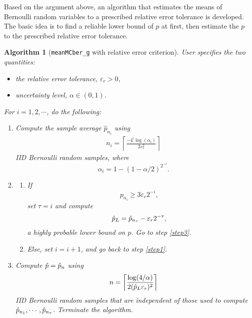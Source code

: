 \documentclass{iitthesis}
\newtheorem{algorithm}[theorem]{Algorithm}
\theoremstyle{definition}
\begin{document}
Based on the argument above, an algorithm that estimates the means of Bernoulli random variables to a prescribed relative error tolerance is developed. The basic idea is to find a reliable lower bound of $p$ at first, then estimate the $p$ to the prescribed relative error tolerance.
\begin{algorithm}[{\tt meanMCber\_g} with relative error criterion]\label{algrel}
User specifies the two quantities:
\begin{itemize}
\item the relative error tolerance, $\varepsilon_r > 0$, 
\item uncertainty level, $\alpha \in (0,1)$.
\end{itemize}
For $i = 1,2,\cdots$, do the following:
\begin{enumerate}
\item \label{step1} 
Compute the sample average $\hat{p}_{n_i}$ using 
\begin{align}\label{relalgni}
n_i = \left \lceil \frac{-4^i \log\left ( \alpha_i \right)}{2\varepsilon_r^2}\right \rceil
\end{align}
 IID Bernoulli random samples, where 
 \begin{equation}\label{alphaiBerRel}
 \alpha_i =1-(1-\alpha/2)^{2^{-i}}.
 \end{equation}
\item \label{step2}
\begin{enumerate}
\item If 
\begin{equation}\label{stoppingcriterionBerRel}
p_{n_i} \geq 3\varepsilon_r 2^{-i},
\end{equation} set $\tau=i$ and compute 
\begin{align}\label{def:hpl}
\hat{p}_L= \hat{p}_{n_\tau} - \varepsilon_r 2^{-\tau},
\end{align}
 a highly probable lower bound on $p$. Go to step \ref{step3}. 
\item Else, set $i = i+1$, and go back to step \ref{step1}.
\end{enumerate}
    \item \label{step3}
Compute $\hat{p} = \hat{p}_n$ using 
\begin{align}\label{reln}
n= \left \lceil \frac{\log (4/\alpha)}{2(\hat{p}_L\varepsilon_{r})^2} \right \rceil 
\end{align}
  IID Bernoulli random samples that are independent of those used to compute $\hat{p}_{n_1}, \cdots, \hat{p}_{n_\tau}$. Terminate the algorithm.
  \end{enumerate}
\end{algorithm}
\end{document}
